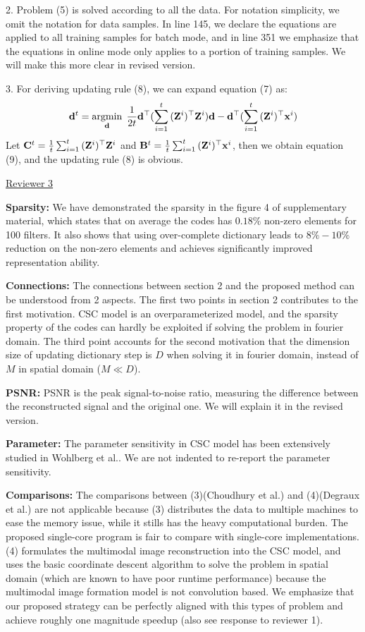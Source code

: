 \documentclass[10pt,twocolumn,letterpaper]{article}
\begin{document}
2. Problem (5) is solved according to all the data. For notation simplicity, we omit the notation for data samples. In line 145, we declare the equations are applied to all training samples for batch mode, and in line 351 we emphasize that the equations in online mode only applies to a portion of training samples. We will make this more clear in revised version.

3. For deriving updating rule (8), we can expand equation (7) as:
\begin{equation}
    \filter^t = \minimize{\filter} \frac{1}{2t} \filter^{\top} (\sum_{i=1}^{t}{(\Code^i)^{\top}\Code^i})\filter - \filter^{\top} (\sum_{i=1}^{t}{(\Code^i)^{\top}\signal^i})
\end{equation}
Let $\surC^t = \frac{1}{t}\sum_{i=1}^{t}{(\Code^i)^{\top}\Code^i}$ and $\surB^t = \frac{1}{t} \sum_{i=1}^{t}{(\Code^i)^{\top}\signal^i}$, then we obtain equation (9), and the updating rule (8) is obvious.

\underline{Reviewer 3}

\textbf{Sparsity:}
We have demonstrated the sparsity in the figure 4 of supplementary material, which states that on average the codes has $0.18\%$ non-zero elements for 100 filters. It also shows that using over-complete dictionary leads to $8\% - 10\%$ reduction on the non-zero elements and achieves significantly improved representation ability.

\textbf{Connections:}
The connections between section 2 and the proposed method can be understood from 2 aspects. The first two points in section 2 contributes to the first motivation. CSC model is an overparameterized model, and the sparsity property of the codes can hardly be exploited if solving the problem in fourier domain. The third point accounts for the second motivation that the dimension size of updating dictionary step is $D$ when solving it in fourier domain, instead of $M$ in spatial domain ($M \ll D$).

\textbf{PSNR:}
PSNR is the peak signal-to-noise ratio, measuring the difference between the reconstructed signal and the original one. We will explain it in the revised version.

\textbf{Parameter:}
The parameter sensitivity in CSC model has been extensively studied in Wohlberg et al.. We are not indented to re-report the parameter sensitivity.

\textbf{Comparisons:}
The comparisons between (3)(Choudhury et al.) and (4)(Degraux et al.) are not applicable because (3) distributes the data to multiple machines to ease the memory issue, while it stills has the heavy computational burden. The proposed single-core program is fair to compare with single-core implementations. (4) formulates the multimodal image reconstruction into the CSC model, and uses the basic coordinate descent algorithm to solve the problem in spatial domain (which are known to have poor runtime performance) because the multimodal image formation model is not convolution based. We emphasize that our proposed strategy can be perfectly aligned with this types of problem and achieve roughly one magnitude speedup (also see response to reviewer 1).
\end{document}
